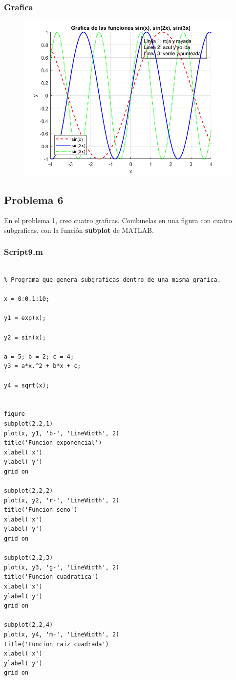 \documentclass{article}
\begin{document}
	\newpage
	
	\subsubsection{Grafica}
	
	\begin{figure}[h]
		\centering
		\includegraphics[width=\textwidth]{grafica8.png}
	\end{figure}
	
	\newpage
	
	\subsection{Problema 6}
	
	En el problema 1, creo cuatro graficas. Combınelas en una figura con cuatro subgraficas, con la función \textbf{subplot} de MATLAB.
	
	\subsubsection{Script9.m}
	
	\begin{lstlisting}

% Programa que genera subgraficas dentro de una misma grafica.

x = 0:0.1:10;

y1 = exp(x);

y2 = sin(x);

a = 5; b = 2; c = 4;
y3 = a*x.^2 + b*x + c;

y4 = sqrt(x);


figure
subplot(2,2,1)
plot(x, y1, 'b-', 'LineWidth', 2)
title('Funcion exponencial')
xlabel('x')
ylabel('y')
grid on

subplot(2,2,2)
plot(x, y2, 'r-', 'LineWidth', 2)
title('Funcion seno')
xlabel('x')
ylabel('y')
grid on

subplot(2,2,3)
plot(x, y3, 'g-', 'LineWidth', 2)
title('Funcion cuadratica')
xlabel('x')
ylabel('y')
grid on

subplot(2,2,4)
plot(x, y4, 'm-', 'LineWidth', 2)
title('Funcion raiz cuadrada')
xlabel('x')
ylabel('y')
grid on

	\end{lstlisting}
	
\end{document}
